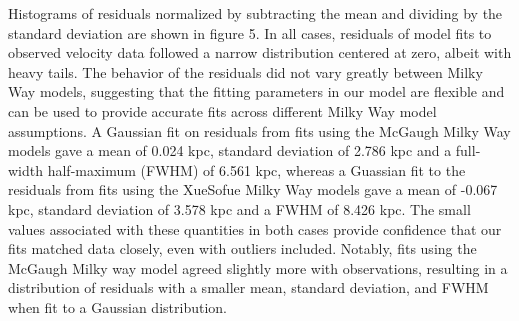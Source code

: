 \documentclass[reprint,%
 amsmath,amssymb,
 aps,
]{revtex4-1}
\begin{document}
Histograms of residuals normalized by subtracting the mean and dividing by the standard deviation are shown in figure 5. In all cases, residuals of model fits to observed velocity data followed a narrow distribution centered at zero, albeit with heavy tails. The behavior of the residuals did not vary greatly between Milky Way models, suggesting that the fitting parameters in our model are flexible and can be used to provide accurate fits across different Milky Way model assumptions. A Gaussian fit on residuals from fits using the McGaugh Milky Way models gave a mean of 0.024 kpc, standard deviation of 2.786 kpc and a full-width half-maximum (FWHM) of 6.561 kpc, whereas a Guassian fit to the residuals from fits using the XueSofue Milky Way models gave a mean of -0.067 kpc, standard deviation of 3.578 kpc and a FWHM of  8.426 kpc. The small values associated with these quantities in both cases provide confidence that our fits matched data closely, even with outliers included. Notably, fits using the McGaugh Milky way model agreed slightly more with observations, resulting in a distribution of residuals with a smaller mean, standard deviation, and FWHM when fit to a Gaussian distribution.
\end{document}
